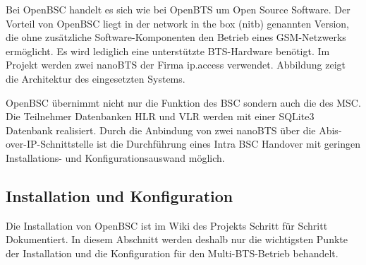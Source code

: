 \label{sec:openbsc}

Bei OpenBSC handelt es sich wie bei OpenBTS um Open Source Software. Der Vorteil von OpenBSC liegt in der network in the box (nitb) genannten Version, die ohne zusätzliche Software-Komponenten den Betrieb eines GSM-Netzwerks ermöglicht. Es wird lediglich eine unterstützte BTS-Hardware benötigt. Im Projekt werden zwei nanoBTS der Firma ip.access verwendet. Abbildung zeigt die Architektur des eingesetzten Systems.



OpenBSC übernimmt nicht nur die Funktion des BSC sondern auch die des MSC. Die Teilnehmer Datenbanken HLR und VLR werden mit einer SQLite3 Datenbank realisiert. Durch die Anbindung von zwei nanoBTS über die Abis-over-IP-Schnittstelle ist die Durchführung eines Intra BSC Handover mit geringen Installations- und Konfigurationsauswand möglich.

\subsection{Installation und Konfiguration}

Die Installation von OpenBSC ist im Wiki des Projekts Schritt für Schritt Dokumentiert. In diesem Abschnitt werden deshalb nur die wichtigsten Punkte der Installation und die Konfiguration für den Multi-BTS-Betrieb behandelt.

